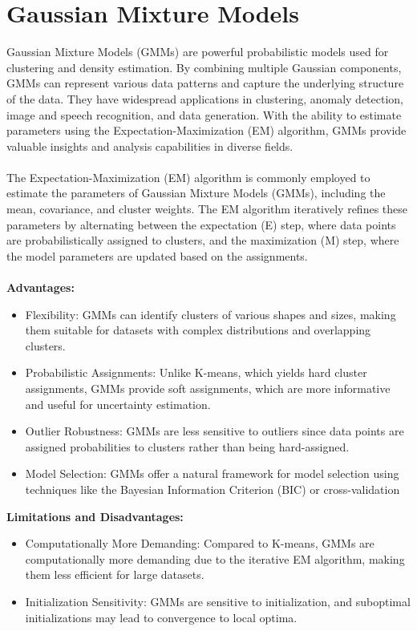 \documentclass{template}
\begin{document}
\section{Gaussian Mixture Models}
Gaussian Mixture Models (GMMs) are powerful probabilistic models used for clustering and density estimation. By combining multiple Gaussian components, GMMs can represent various data patterns and capture the underlying structure of the data. They have widespread applications in clustering, anomaly detection, image and speech recognition, and data generation. With the ability to estimate parameters using the Expectation-Maximization (EM) algorithm, GMMs provide valuable insights and analysis capabilities in diverse fields.\\\\
The Expectation-Maximization (EM) algorithm is commonly employed to estimate the parameters of Gaussian Mixture Models (GMMs), including the mean, covariance, and cluster weights. The EM algorithm iteratively refines these parameters by alternating between the expectation (E) step, where data points are probabilistically assigned to clusters, and the maximization (M) step, where the model parameters are updated based on the assignments.\\\\
\textbf{Advantages: }
    \begin{itemize}
    \item Flexibility: GMMs can identify clusters of various shapes and sizes, making them suitable for datasets with complex distributions and overlapping clusters.
    \item Probabilistic Assignments: Unlike K-means, which yields hard cluster assignments, GMMs provide soft assignments, which are more informative and useful for uncertainty estimation.
    \item Outlier Robustness: GMMs are less sensitive to outliers since data points are assigned probabilities to clusters rather than being hard-assigned.
    \item Model Selection: GMMs offer a natural framework for model selection using techniques like the Bayesian Information Criterion (BIC) or cross-validation
\end{itemize}
\textbf{Limitations and Disadvantages:}
    \begin{itemize}
    \item Computationally More Demanding: Compared to K-means, GMMs are computationally more demanding due to the iterative EM algorithm, making them less efficient for large datasets.
    \item Initialization Sensitivity: GMMs are sensitive to initialization, and suboptimal initializations may lead to convergence to local optima.
\end{itemize}
\end{document}
